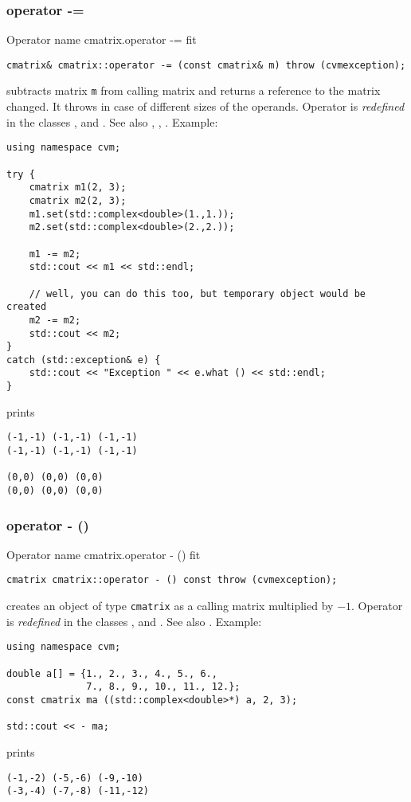 \subsubsection{operator -=}
Operator%
\pdfdest name {cmatrix.operator -=} fit
\begin{verbatim}
cmatrix& cmatrix::operator -= (const cmatrix& m) throw (cvmexception);
\end{verbatim}
subtracts  matrix \verb"m" from  calling matrix
and returns a reference to
the matrix changed.
It throws  
in case of different sizes of the operands.
Operator is \emph{redefined} in the classes
,  
and .
See also ,
,
.
Example:
\begin{Verbatim}
using namespace cvm;

try {
    cmatrix m1(2, 3);
    cmatrix m2(2, 3);
    m1.set(std::complex<double>(1.,1.));
    m2.set(std::complex<double>(2.,2.));

    m1 -= m2;
    std::cout << m1 << std::endl;

    // well, you can do this too, but temporary object would be created
    m2 -= m2; 
    std::cout << m2;
}
catch (std::exception& e) {
    std::cout << "Exception " << e.what () << std::endl;
}
\end{Verbatim}
prints
\begin{Verbatim}
(-1,-1) (-1,-1) (-1,-1)
(-1,-1) (-1,-1) (-1,-1)

(0,0) (0,0) (0,0)
(0,0) (0,0) (0,0)
\end{Verbatim}
\newpage



\subsubsection{operator - ()}
Operator%
\pdfdest name {cmatrix.operator - ()} fit
\begin{verbatim}
cmatrix cmatrix::operator - () const throw (cvmexception);
\end{verbatim}
creates an object of type \verb"cmatrix" as
a calling  matrix multiplied by $-1$.
Operator is \emph{redefined} in the classes
,  
and .
See also .
Example:
\begin{Verbatim}
using namespace cvm;

double a[] = {1., 2., 3., 4., 5., 6.,
              7., 8., 9., 10., 11., 12.};
const cmatrix ma ((std::complex<double>*) a, 2, 3);

std::cout << - ma;
\end{Verbatim}
prints
\begin{Verbatim}
(-1,-2) (-5,-6) (-9,-10)
(-3,-4) (-7,-8) (-11,-12)
\end{Verbatim}
\newpage




